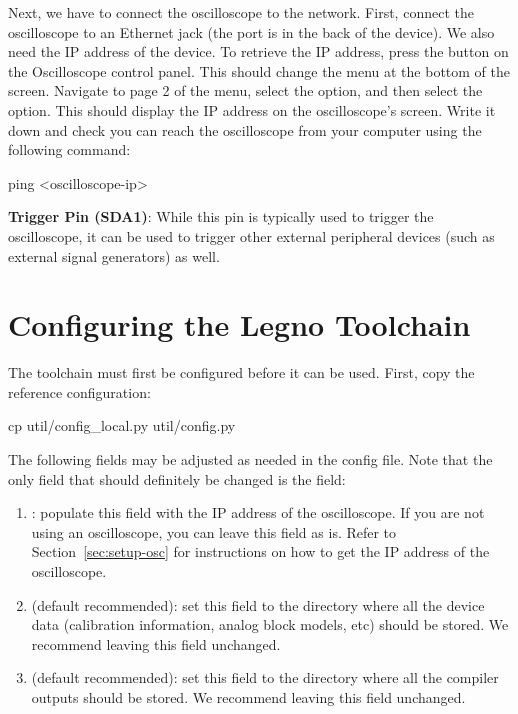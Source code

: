 Next, we have to connect the oscilloscope to the network. First, connect the
oscilloscope to an Ethernet jack (the port is in the back of the device). We
also need the IP address of the device. To retrieve the IP address, press the
 button on the Oscilloscope control panel. This should change the
menu at the bottom of the screen. Navigate to page 2 of the menu, select the
 option, and then select the  option. This should display
the IP address on the oscilloscope's screen. Write it down and check you can
reach the oscilloscope from your computer using the following command:

\begin{snippet}
ping <oscilloscope-ip>
\end{snippet}

\noindent\textbf{Trigger Pin (SDA1)}: While this pin is typically used to
trigger the oscilloscope, it can be used to trigger other external peripheral
devices (such as external signal generators) as well. 


\section{Configuring the Legno Toolchain}

The \legno toolchain must first be configured before it can be used. First, copy
the reference configuration:

\begin{snippet}
cp util/config_local.py util/config.py
\end{snippet}

The following fields may be adjusted as needed in the config file. Note that the
only field that should definitely be changed is the  field:

\begin{enumerate}
\item {}: populate this field with the IP address of the oscilloscope.
  If you are not using an oscilloscope, you can leave this field as is. Refer
  to Section~\ref{sec:setup-osc} for instructions on how to get the IP address
  of the oscilloscope.
\item{} (default recommended): set this field to the directory where all the device
  data (calibration information, analog block models, etc) should be stored. We
  recommend leaving this field unchanged.
\item{} (default recommended): set this field to the directory where all the compiler
  outputs should be stored. We recommend leaving this field unchanged.
\end{enumerate}

